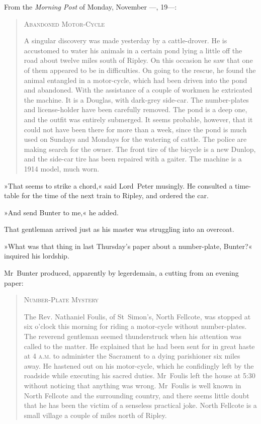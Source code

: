 From the \textit{Morning Post} of Monday, November —, 19—:
\begin{quote}
\begin{center}
\textsc{Abandoned Motor-Cycle}
\end{center}

A singular discovery was made yesterday by a cattle-drover. He is accustomed to water his animals in a certain pond lying a little off the road about twelve miles south of Ripley. On this occasion he saw that one of them appeared to be in difficulties. On going to the rescue, he found the animal entangled in a motor-cycle, which had been driven into the pond and abandoned. With the assistance of a couple of workmen he extricated the machine. It is a Douglas, with dark-grey side-car. The number-plates and license-holder have been carefully removed. The pond is a deep one, and the outfit was entirely submerged. It seems probable, however, that it could not have been there for more than a week, since the pond is much used on Sundays and Mondays for the watering of cattle. The police are making search for the owner. The front tire of the bicycle is a new Dunlop, and the side-car tire has been repaired with a gaiter. The machine is a 1914 model, much worn.
\end{quote}

»That seems to strike a chord,« said Lord~Peter musingly. He consulted a time-table for the time of the next train to Ripley, and ordered the car.

»And send Bunter to me,« he added.

That gentleman arrived just as his master was struggling into an overcoat.

»What was that thing in last Thursday's paper about a number-plate, Bunter?« inquired his lordship.

Mr~Bunter produced, apparently by legerdemain, a cutting from an evening paper:

\pagebreak[2]

\begin{quote}
\begin{center}
\textsc{Number-Plate Mystery}
\end{center}

The Rev. Nathaniel Foulis, of St~Simon's, North Fellcote, was stopped at six o'clock this morning for riding a motor-cycle without number-plates. The reverend gentleman seemed thunderstruck when his attention was called to the matter. He explained that he had been sent for in great haste at 4 \textsc{a.m.} to administer the Sacrament to a dying parishioner six miles away. He hastened out on his motor-cycle, which he confidingly left by the roadside while executing his sacred duties.  Mr~Foulis left the house at 5:30 without noticing that anything was wrong. Mr~Foulis is well known in North Fellcote and the surrounding country, and there seems little doubt that he has been the victim of a senseless practical joke. North Fellcote is a small village a couple of miles north of Ripley.
\end{quote}

